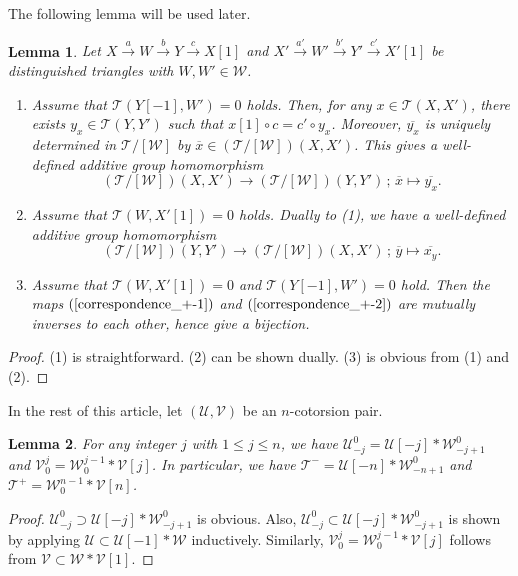 \documentclass[a4paper,reqno,10pt]{amsart}
\newtheorem{lemma}[lemma]{Lemma}
\theoremstyle{definition}
\theoremstyle{definition}
\theoremstyle{definition}
\theoremstyle{definition}
\theoremstyle{plain}
\newcommand{\CT}{\mathcal{T}}
\newcommand{\CU}{\mathcal{U}}
\newcommand{\CV}{\mathcal{V}}
\newcommand{\CW}{\mathcal{W}}
\begin{document}
The following lemma will be used later.
\begin{lemma}\label{lem:for_adjoint_pair_+-}
Let $X\xrightarrow{a}W\xrightarrow{b}Y\xrightarrow{c}X[1]$ and $X'\xrightarrow{a'}W'\xrightarrow{b'}Y'\xrightarrow{c'}X'[1]$ be distinguished triangles with $W,W'\in\CW$.
\begin{enumerate}
\item Assume that $\CT(Y[-1],W')=0$ holds. 
\color{blue}Then, 
\normalcolor
for any $x\in\CT(X,X')$, there exists $y_x\in\CT(Y,Y')$ such that $x[1]\circ c=c'\circ y_x$. Moreover, $\overline{y_x}$ is uniquely determined in $\CT/[\CW]$ by $\overline{x}\in(\CT/[\CW])(X,X')$. This gives a well-defined additive group homomorphism
\begin{equation}\label{correspondence_+-1}
(\CT/[\CW])(X,X')\to(\CT/[\CW])(Y,Y')\, ;\, \overline{x}\mapsto\overline{y_x}.
\end{equation}
\item Assume that $\CT(W,X'[1])=0$ holds. %
Dually to {\rm (1)}, we have a well-defined additive group homomorphism
\begin{equation}\label{correspondence_+-2}
(\CT/[\CW])(Y,Y')\to(\CT/[\CW])(X,X')\, ;\, \overline{y}\mapsto\overline{x_y}.
\end{equation}
\item Assume that $\CT(W,X'[1])=0$ and $\CT(Y[-1],W')=0$ hold. Then the maps $(\ref{correspondence_+-1})$ and $(\ref{correspondence_+-2})$ are mutually inverses to each other, hence 
\color{blue}
give
\normalcolor
a bijection.
\end{enumerate}
\end{lemma}
\begin{proof}
{\rm (1)} is straightforward.
\normalcolor
{\rm (2)} can be shown dually.
{\rm (3)} is obvious from {\rm (1)} and {\rm (2)}.
\end{proof}

In the rest of this article, let $(\CU,\CV)$ be an $n$-cotorsion pair.

\begin{lemma}\label{lem:equation_T-T+}
For any integer $j$ with $1\le j\le n$, we have
$\CU_{-j}^0=\CU[-j]\ast\CW_{-j+1}^0$ and $\CV_0^j=\CW_0^{j-1}\ast\CV[j]$.
In particular, we have
$\CT^-=\CU[-n]\ast\CW_{-n+1}^0$ and $\CT^+=\CW_0^{n-1}\ast\CV[n]$.
\end{lemma}
\begin{proof}
$\CU_{-j}^0\supset\CU[-j]\ast\CW_{-j+1}^0$ is obvious. Also,
$\CU_{-j}^0\subset\CU[-j]\ast\CW_{-j+1}^0$ is shown by applying $\CU\subset\CU[-1]\ast\CW$ inductively. Similarly, $\CV_0^j=\CW_0^{j-1}\ast\CV[j]$ follows from $\CV\subset\CW\ast\CV[1]$. 
\end{proof}
\end{document}
